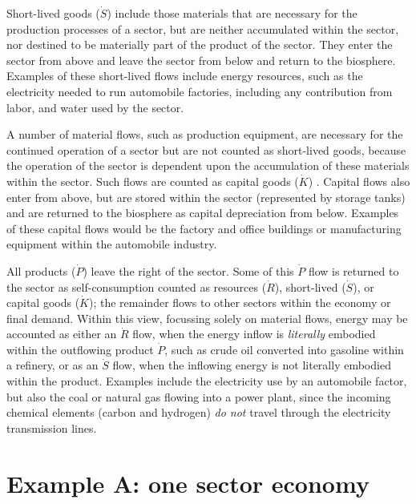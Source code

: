 Short-lived goods ($\dot{S}$)  
include those materials 
that are necessary for the production processes of a sector, 
but are neither accumulated within the sector, 
nor destined to be materially part of the product of the sector. 
They enter the sector from above and leave the sector from
below and return to the biosphere. 
Examples of these short-lived flows include energy resources, such as
the electricity needed to run automobile factories,
including any contribution from labor, 
and water used by the sector. 

A number of material flows, such as production equipment,
are necessary for the continued operation of a sector 
but are not counted as short-lived goods, 
because the operation of the sector is dependent 
upon the accumulation of these materials within the sector. 
Such flows are counted as capital goods ($\dot{K}$)
 . Capital flows also enter from above, 
but are stored within the sector (represented by storage tanks) 
and are returned to the biosphere as capital depreciation from below.
Examples of these capital flows would be the factory and office buildings or
manufacturing equipment within the automobile industry.

All products ($\dot{P}$) leave the right of the sector. 
Some of this $\dot{P}$ flow is returned to the sector as self-consumption 
counted as resources ($\dot{R}$), 
short-lived ($\dot{S}$), or 
capital goods ($\dot{K}$); 
the remainder flows to other sectors within the economy or final demand. 
Within this view, focussing solely on material flows, energy may be accounted
as either an $\dot{R}$ flow, when the energy inflow is \emph{literally} embodied
within the outflowing product $\dot{P}$, such as crude oil converted into
gasoline within a refinery, or as an $\dot{S}$ flow, when the inflowing energy
is not literally embodied within the product. Examples include the electricity
use by an automobile factor, but also the coal or natural gas flowing into a
power plant, since the incoming chemical elements (carbon and hydrogen) \emph{do
not} travel through the electricity transmission lines.





\section{Example A: one sector economy}
\label{sec:A_materials}


